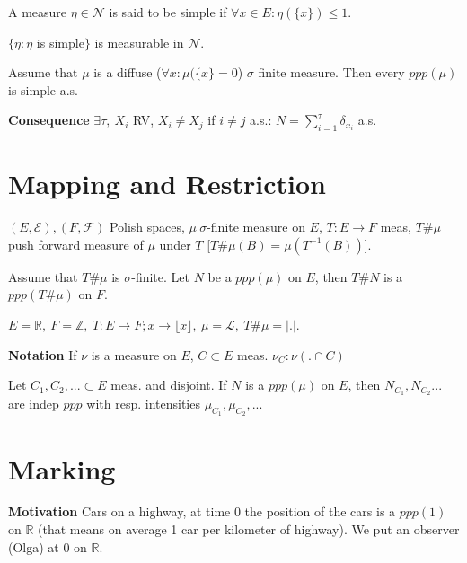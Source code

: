 \begin{defn}
	A measure $\eta \in \mathcal{N}$ is said to be simple if $\forall x \in E: \eta(\{x\}) \leq 1$.
\end{defn}

\begin{prop}[]
	$\{\eta: \eta$ is simple$ \}$ is measurable in $ \mathcal{N} $.
\end{prop}

\begin{theorem}[]
	Assume that $\mu $ is a diffuse ($\forall x: \mu (\{x\}=0$) $\sigma$ finite measure. Then every $ppp( \mu )$ is simple a.s.
\end{theorem}

\textbf{Consequence} $\exists \tau,\ X_i$ RV, $X_i \neq X_j$ if $i \neq j$ a.s.: $N=\sum_{i=1}^{\tau} \delta_{x_i}$ a.s.

\section{Mapping and Restriction}
$(E, \mathcal{E}), (F, \mathcal{F})$ Polish spaces, $\mu\ \sigma$-finite measure on $E$,  $T:E \to F$ meas, $T\#\mu $ push forward measure of $\mu $ under $T$ [$T\#\mu(B)=\mu(T^{-1}(B))$].

\begin{theorem}[]
	Assume that $T\#\mu$ is $\sigma$-finite. Let $N$ be a $ppp(\mu)$ on $E$, then $T\#N$ is a $ppp(T\#\mu)$ on $F$.
\end{theorem}

\begin{ex}[]
	$E=\mathbb{R},\ F=\mathbb{Z},\ T:E \to F; x \to \lfloor x \rfloor,\ \mu= \mathcal{L},\ T\#\mu=|.|$.
\end{ex}
\noindent
\textbf{Notation} If $\nu $ is a measure on $E$, $C \subset E$ meas.  $\nu _C: \nu(. \cap C)$

\begin{theorem}[Restriction]
	Let $C_1, C_2,... \subset E$ meas. and disjoint. If $N$ is a  $ppp(\mu)$ on  $E$, then $N_{C_1}, N_{C_2}...$ are indep $ppp$ with resp. intensities $\mu_{C_1}, \mu_{C_2},...$	
\end{theorem}

\section{Marking}
\noindent
\textbf{Motivation} Cars on a highway, at time 0 the position of the cars is a $ppp(1)$ on $\mathbb{R}$ (that means on average 1 car per kilometer of highway). We put an observer (Olga) at 0 on $\mathbb{R}$.

